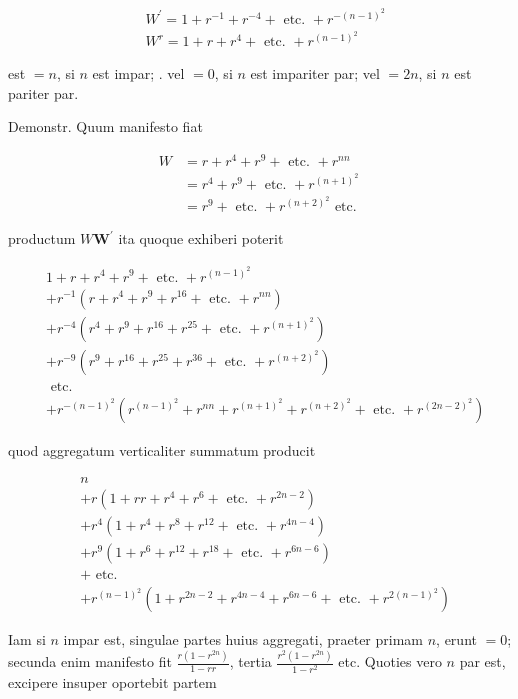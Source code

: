 \documentclass[10pt]{article}
\begin{document}
\[
\begin{aligned}
& W^{\prime}=1+r^{-1}+r^{-4}+\text { etc. }+r^{-(n-1)^{2}} \\
& W^{r}=1+r+r^{4}+\text { etc. }+r^{(n-1)^{2}}
\end{aligned}
\]

est \(=n\), si \(n\) est impar; . vel \(=0\), si \(n\) est impariter par; vel \(=2 n\), si \(n\) est pariter par.

Demonstr. Quum manifesto fiat

\[
\begin{aligned}
W & =r+r^{4}+r^{9}+\text { etc. }+r^{n n} \\
& =r^{4}+r^{9}+\text { etc. }+r^{(n+1)^{2}} \\
& =r^{9}+\text { etc. }+r^{(n+2)^{2}} \text { etc. }
\end{aligned}
\]

productum \(W \boldsymbol{W}^{\prime}\) ita quoque exhiberi poterit

\[
\begin{aligned}
& 1+r+r^{4}+r^{9}+\text { etc. }+r^{(n-1)^{2}} \\
&+ r^{-1}\left(r+r^{4}+r^{9}+r^{16}+\text { etc. }+r^{n n}\right) \\
&+ r^{-4}\left(r^{4}+r^{9}+r^{16}+r^{25}+\text { etc. }+r^{(n+1)^{2}}\right) \\
&+ r^{-9}\left(r^{9}+r^{16}+r^{25}+r^{36}+\text { etc. }+r^{(n+2)^{2}}\right) \\
& \text { etc. } \\
&+ r^{-(n-1)^{2}}\left(r^{(n-1)^{2}}+r^{n n}+r^{(n+1)^{2}}+r^{(n+2)^{2}}+\text { etc. }+r^{(2 n-2)^{2}}\right)
\end{aligned}
\]

quod aggregatum verticaliter summatum producit

\[
\begin{aligned}
& n \\
& +r\left(1+r r+r^{4}+r^{6}+\text { etc. }+r^{2 n-2}\right) \\
& +r^{4}\left(1+r^{4}+r^{8}+r^{12}+\text { etc. }+r^{4 n-4}\right) \\
& +r^{9}\left(1+r^{6}+r^{12}+r^{18}+\text { etc. }+r^{6 n-6}\right) \\
& + \text { etc. } \\
& +r^{(n-1)^{2}}\left(1+r^{2 n-2}+r^{4 n-4}+r^{6 n-6}+\text { etc. }+r^{2(n-1)^{2}}\right)
\end{aligned}
\]

Iam si \(n\) impar est, singulae partes huius aggregati, praeter primam \(n\), erunt \(=0\); secunda enim manifesto fit \(\frac{r\left(1-r^{2 n}\right)}{1-r r}\), tertia \(\frac{r^{2}\left(1-r^{2 n}\right)}{1-r^{2}}\) etc. Quoties vero \(n\) par est, excipere insuper oportebit partem
\end{document}
